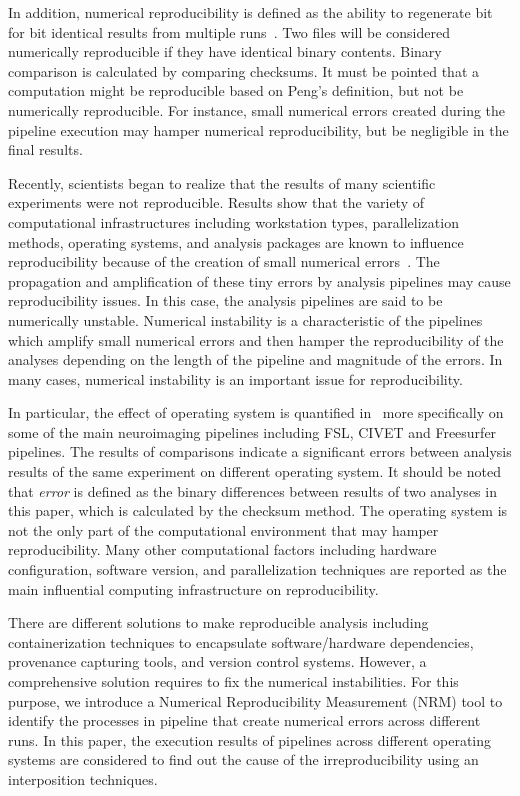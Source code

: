 \documentclass[a4paper,num-refs]{oup-contemporary}
\begin{document}
In addition, numerical reproducibility is defined as the ability to 
regenerate bit for bit identical results from multiple 
runs~\cite{hill2017numerical}. Two files will be considered numerically 
reproducible if they have identical binary contents. Binary comparison 
is calculated by comparing checksums. It must be pointed that a 
computation might be reproducible based on Peng's definition, but not 
be numerically reproducible. For instance, small numerical errors 
created during the pipeline execution may hamper numerical 
reproducibility, but be negligible in the final results.

Recently, scientists began to realize that the results of many 
scientific experiments were not reproducible. Results show that the 
variety of computational infrastructures including workstation types, 
parallelization methods, operating systems, and analysis packages are 
known to influence reproducibility because of the creation of small 
numerical errors~\cite{Gronenschild2012, diethelm2012limits, 
Glatard2015, bowring2018exploring}. The propagation and amplification 
of these tiny errors by analysis pipelines may cause reproducibility 
issues. 
In this case, the analysis pipelines are said to be numerically 
unstable. Numerical instability is a characteristic of the pipelines 
which amplify small numerical errors and then hamper the 
reproducibility of the analyses depending on the length of the pipeline 
and magnitude of the errors. In many cases, numerical instability is an 
important issue for reproducibility.
 
In particular, the effect of operating system is quantified 
in~\cite{Glatard2015, Gronenschild2012} more specifically on some of 
the main neuroimaging pipelines including FSL, CIVET and Freesurfer 
pipelines. The results of comparisons indicate a significant errors 
between analysis results of the same experiment on different operating 
system. It should be noted that \emph{error} is defined as the binary 
differences between results of two analyses in this paper, which is 
calculated by the checksum method. 
The operating system is not the only part of the computational 
environment that may hamper reproducibility. Many other computational 
factors including hardware configuration, software version, and 
parallelization techniques are reported as the main influential 
computing infrastructure on reproducibility. 

There are different solutions to make reproducible analysis including 
containerization techniques to encapsulate software/hardware 
dependencies, provenance capturing tools, and version control systems. 
However, a comprehensive solution requires to fix the numerical 
instabilities. For this purpose, we introduce a Numerical 
Reproducibility Measurement (NRM) tool to identify the processes in 
pipeline that create numerical errors across different runs. In this 
paper, the execution results of pipelines across different operating 
systems are considered to find out the cause of the irreproducibility 
using an interposition techniques.
\end{document}
